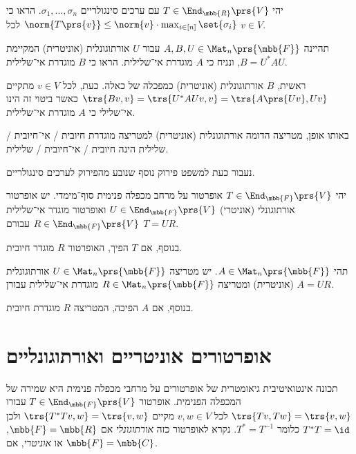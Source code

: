 \documentclass[a4paper,10pt,twoside,openany]{book}
\begin{document}
\begin{exercisechap}
יהי
$T \in \End_{\mbb{R}}\prs{V}$
עם ערכים סינגולריים
$\sigma_1, \ldots, \sigma_n$.
הראו כי
$\norm{T\prs{v}} \leq \norm{v} \cdot \max_{i \in [n]} \set{\sigma_i}$
לכל
$v \in V$.
\end{exercisechap}

\begin{exercisechap}
תהיינה
$A,B,U \in \Mat_n\prs{\mbb{F}}$
עבור
$U$
אורתוגונלית (אוניטרית) המקיימת
$B = U^* A U$,
ונניח כי
$A$
מוגדרת אי־שלילית.
הראו כי
$B$
מוגדרת אי־שלילית.
\end{exercisechap}

\begin{solution}
ראשית,
$B$
אורתוגונלית (אוניטרית) כמפכלה של כאלה.
כעת, לכל
$v \in V$
מתקיים
$\trs{Bv, v} = \trs{U^* A U v, v} = \trs{A \prs{U v}, U v}$
כאשר ביטוי זה הינו אי־שלילי כי
$A$
מוגדרת אי־שלילית.
\end{solution}

\begin{remark}
באותו אופן, מטריצה הדומה אורתוגונלית (אוניטרית) למטריצה מוגדרת
חיובית%
\slash%
אי־חיובית%
\slash%
שלילית הינה
חיובית%
\slash%
אי־חיובית%
\slash%
שלילית.
\end{remark}

נעבור כעת למשפט פירוק נוסף שנובע מהפירוק לערכים סינגולריים.

\begin{theorem}
יהי
$T \in \End_{\mbb{F}}\prs{V}$
אופרטור על מרחב מכפלה פנימית סוף־מימדי. יש אופרטור אורתוגונלי (אוניטרי)
$U \in \End_{\mbb{F}}\prs{V}$
ואופרטור מוגדר אי־שלילית
$R \in \End_{\mbb{F}}\prs{V}$
עבורם
$T = UR$.

בנוסף, אם
$T$
הפיך, האופרטור
$R$
מוגדר חיובית.
\end{theorem}

\begin{theorem}
תהי
$A \in \Mat_n\prs{\mbb{F}}$.
יש מטריצה
$U \in \Mat_n\prs{\mbb{F}}$
אורתוגונלית (אוניטרית) ומטריצה
$R \in \Mat_n\prs{\mbb{F}}$
מוגדרת אי־‏שלילית עבורן
$A = UR$.

בנוסף,
אם
$A$
הפיכה, המטריצה
$R$
מוגדרת חיובית.
\end{theorem}

\section{אופרטורים אוניטריים ואורתוגונליים}

תכונה אינטואיטיבית גיאומטרית של אופרטורים על מרחבי מכפלה פנימית היא שמירה של המכפלה הפנימית.
אופרטור
$T \in \End_{\mbb{F}}\prs{V}$
עבורו
$\trs{Tv, Tw} = \trs{v,w}$
לכל
$v,w \in V$
מקיים
$\trs{T^* T v, w} = \trs{v,w}$
ולכן
$T^* T = \id$
כלומר
$T^* = T^{-1}$.
נקרא לאופרטור כזה
\emph{אורתוגונלי}
אם
$\mbb{F} = \mbb{R}$,
או
\emph{אוניטרי},
אם
$\mbb{F} = \mbb{C}$.
\end{document}
